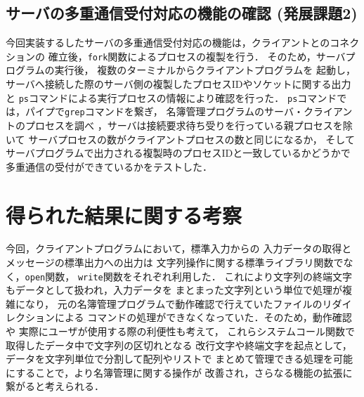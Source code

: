 \subsection{サーバの多重通信受付対応の機能の確認 (発展課題2)}
今回実装するしたサーバの多重通信受付対応の機能は，クライアントとのコネクションの
確立後，\verb|fork|関数によるプロセスの複製を行う．
そのため，サーバプログラムの実行後，
複数のターミナルからクライアントプログラムを
起動し，サーバへ接続した際のサーバ側の複製したプロセスIDやソケットに関する出力と
\verb|ps|コマンドによる実行プロセスの情報により確認を行った．
\verb|ps|コマンドでは，パイプで\verb|grep|コマンドを繋ぎ，
名簿管理プログラムのサーバ・クライアントのプロセスを調べ
，サーバは接続要求待ち受りを行っている親プロセスを除いて
サーバプロセスの数がクライアントプロセスの数と同じになるか，
そしてサーバプログラムで出力される複製時のプロセスIDと一致しているかどうかで
多重通信の受付ができているかをテストした．

\section{得られた結果に関する考察}
今回，クライアントプログラムにおいて，標準入力からの
入力データの取得とメッセージの標準出力への出力は
文字列操作に関する標準ライブラリ関数でなく，\verb|open|関数，
\verb|write|関数をそれぞれ利用した．
これにより文字列の終端文字もデータとして扱われ，入力データを
まとまった文字列という単位で処理が複雑になり，
元の名簿管理プログラムで動作確認で行えていたファイルのリダイレクションによる
コマンドの処理ができなくなっていた．そのため，動作確認や
実際にユーザが使用する際の利便性も考えて，
これらシステムコール関数で取得したデータ中で文字列の区切れとなる
改行文字や終端文字を起点として，データを文字列単位で分割して配列やリストで
まとめて管理できる処理を可能にすることで，より名簿管理に関する操作が
改善され，さらなる機能の拡張に繋がると考えられる．


